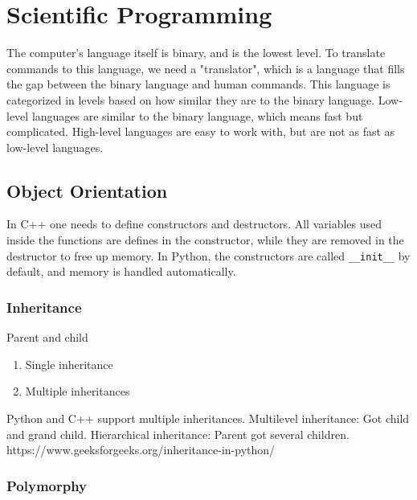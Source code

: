 \chapter{Scientific Programming}
The computer's language itself is binary, and is the lowest level. To translate commands to this language, we need a "translator", which is a language that fills the gap between the binary language and human commands. This language is categorized in levels based on how similar they are to the binary language. Low-level languages are similar to the binary language, which means fast but complicated. High-level languages are easy to work with, but are not as fast as low-level languages. 

\section{Object Orientation}
In C++ one needs to define constructors and destructors. All variables used inside the functions are defines in the constructor, while they are removed in the destructor to free up memory.  In Python, the constructors are called \texttt{\_\_init\_\_} by default, and memory is handled automatically.
\subsection{Inheritance}
Parent and child

\begin{enumerate}
	\item Single inheritance
	\item Multiple inheritances
\end{enumerate}

Python and C++ support multiple inheritances. Multilevel inheritance: Got child and grand child. Hierarchical inheritance: Parent got several children. https://www.geeksforgeeks.org/inheritance-in-python/

\subsection{Polymorphy}